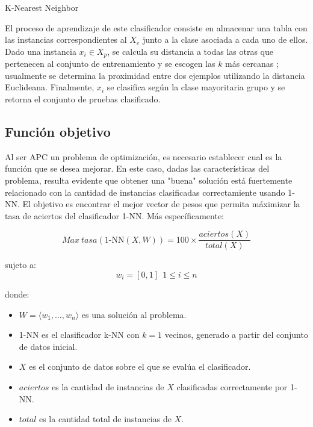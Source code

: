 \documentclass{ci5652}
\begin{document}
\begin{algorithm}
 \DontPrintSemicolon
 \vspace*{0.1cm}
 \vspace*{0.1cm}
 \caption{K-Nearest Neighbor}
\end{algorithm}

El proceso de aprendizaje de este clasificador consiste en almacenar una tabla
con las instancias correspondientes al $X_e$ junto a la clase asociada a cada 
uno de ellos. Dado una instancia $x_i \in X_p$, se calcula su distancia a todas
las otras que pertenecen al conjunto de entrenamiento y se escogen las $k$ más
cercanas \cite{Herrera_2017}; usualmente se determina la proximidad entre dos
ejemplos utilizando la distancia Euclideana. Finalmente, $x_i$ se clasifica  
según la clase mayoritaria grupo y se retorna el conjunto de pruebas clasificado.


\subsection{Función objetivo}

Al ser APC un problema de optimización, es necesario establecer cual es la 
función que se desea mejorar. En este caso, dadas las características del
problema, resulta evidente que obtener una "buena" solución está fuertemente
relacionado con la cantidad de instancias clasificadas correctamiente usando
1-NN. El objetivo es encontrar el mejor vector de pesos que permita máximizar la
tasa de aciertos del clasificador 1-NN. Más específicamente:

\begin{equation}
  Max\ tasa(\text{1-NN}(X, W)) = 100 \times \frac{aciertos(X)}{total(X)}
\end{equation}

sujeto a:
\[
w_i = [0, 1] \ \ 1 \leq i \leq n
\]

donde:
\begin{itemize}
  \item $W = \langle w_1, \dots, w_n\rangle$ es una solución al problema.
  \item 1-NN es el clasificador k-NN con $k=1$ vecinos, generado a partir del
  conjunto de datos inicial. 
  \item $X$ es el conjunto de datos sobre el que se evalúa el clasificador.
  \item $aciertos$ es la cantidad de instancias de $X$ clasificadas 
  correctamente por 1-NN.
  \item $total$ es la cantidad total de instancias de $X$.
\end{itemize}
\end{document}
